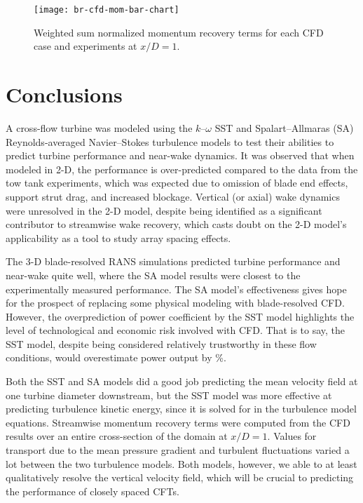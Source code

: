 \begin{figure}
    \centering

    \texttt{[image: br-cfd-mom-bar-chart]}

    \caption{Weighted sum normalized momentum recovery terms for each CFD case
        and experiments\cite{Bachant2016-RVAT-Re-dep} at $x/D=1$.}

    \label{fig:br-cfd-recovery}
\end{figure}


\section{Conclusions}

A cross-flow turbine was modeled using the $k$--$\omega$ SST and
Spalart--Allmaras (SA) Reynolds-averaged Navier--Stokes turbulence models to test
their abilities to predict turbine performance and near-wake dynamics. It was
observed that when modeled in 2-D, the performance is over-predicted compared to
the data from the tow tank experiments, which was expected due to omission of
blade end effects, support strut drag, and increased blockage. Vertical (or
axial) wake dynamics were unresolved in the 2-D model, despite being identified
as a significant contributor to streamwise wake recovery, which casts doubt on
the 2-D model's applicability as a tool to study array spacing effects.

The 3-D blade-resolved RANS simulations predicted turbine performance and
near-wake quite well, where the SA model results were closest to the
experimentally measured performance. The SA model's effectiveness gives hope for
the prospect of replacing some physical modeling with blade-resolved CFD.
However, the  overprediction of power coefficient by the SST model highlights
the level of technological and economic risk involved with CFD. That is to say,
the SST model, despite being considered relatively trustworthy in these flow
conditions, would overestimate power output by \%.

Both the SST and SA models did a good job predicting the mean velocity field at
one turbine diameter downstream, but the SST model was more effective at
predicting turbulence kinetic energy, since it is solved for in the turbulence
model equations. Streamwise momentum recovery terms were computed from the CFD
results over an entire cross-section of the domain at $x/D=1$. Values for
transport due to the mean pressure gradient and turbulent fluctuations varied a
lot between the two turbulence models. Both models, however, we able to at least
qualitatively resolve the vertical velocity field, which will be crucial to
predicting the performance of closely spaced CFTs.

